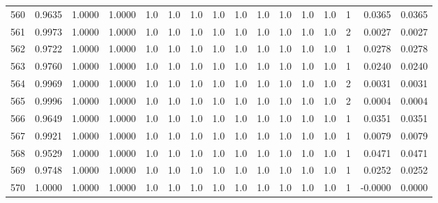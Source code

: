 \begin{tabular}{lrrrrrrrrrrrrrrr}
560 &      0.9635 &  1.0000 &  1.0000 &     1.0 &     1.0 &     1.0 &     1.0 &     1.0 &     1.0 &     1.0 &      1.0 &        1.0 &      1 &                    0.0365 &                     0.0365 \\
561 &      0.9973 &  1.0000 &  1.0000 &     1.0 &     1.0 &     1.0 &     1.0 &     1.0 &     1.0 &     1.0 &      1.0 &        1.0 &      2 &                    0.0027 &                     0.0027 \\
562 &      0.9722 &  1.0000 &  1.0000 &     1.0 &     1.0 &     1.0 &     1.0 &     1.0 &     1.0 &     1.0 &      1.0 &        1.0 &      1 &                    0.0278 &                     0.0278 \\
563 &      0.9760 &  1.0000 &  1.0000 &     1.0 &     1.0 &     1.0 &     1.0 &     1.0 &     1.0 &     1.0 &      1.0 &        1.0 &      1 &                    0.0240 &                     0.0240 \\
564 &      0.9969 &  1.0000 &  1.0000 &     1.0 &     1.0 &     1.0 &     1.0 &     1.0 &     1.0 &     1.0 &      1.0 &        1.0 &      2 &                    0.0031 &                     0.0031 \\
565 &      0.9996 &  1.0000 &  1.0000 &     1.0 &     1.0 &     1.0 &     1.0 &     1.0 &     1.0 &     1.0 &      1.0 &        1.0 &      2 &                    0.0004 &                     0.0004 \\
566 &      0.9649 &  1.0000 &  1.0000 &     1.0 &     1.0 &     1.0 &     1.0 &     1.0 &     1.0 &     1.0 &      1.0 &        1.0 &      1 &                    0.0351 &                     0.0351 \\
567 &      0.9921 &  1.0000 &  1.0000 &     1.0 &     1.0 &     1.0 &     1.0 &     1.0 &     1.0 &     1.0 &      1.0 &        1.0 &      1 &                    0.0079 &                     0.0079 \\
568 &      0.9529 &  1.0000 &  1.0000 &     1.0 &     1.0 &     1.0 &     1.0 &     1.0 &     1.0 &     1.0 &      1.0 &        1.0 &      1 &                    0.0471 &                     0.0471 \\
569 &      0.9748 &  1.0000 &  1.0000 &     1.0 &     1.0 &     1.0 &     1.0 &     1.0 &     1.0 &     1.0 &      1.0 &        1.0 &      1 &                    0.0252 &                     0.0252 \\
570 &      1.0000 &  1.0000 &  1.0000 &     1.0 &     1.0 &     1.0 &     1.0 &     1.0 &     1.0 &     1.0 &      1.0 &        1.0 &      1 &                   -0.0000 &                     0.0000 \\

\end{tabular}
